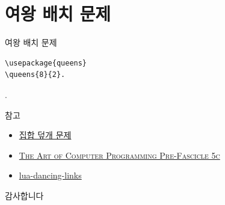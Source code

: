 \documentclass[xcolor=svgnames]{beamer}
\begin{document}
\section{여왕 배치 문제}

%
\begin{frame}[fragile]{여왕 배치 문제}
\begin{verbatim}
\usepackage{queens}
\queens{8}{2}.
\end{verbatim}
\vspace{-10mm}
.
\end{frame}


%
\begin{frame}{참고}
  \begin{itemize}
  \item \href{https://goo.gl/44hiLo}{집합 덮개 문제}
  \item \href{http://www-cs-faculty.stanford.edu/~knuth/fasc5c.ps.gz}
    {\textsc{The Art of Computer Programming Pre-Fascicle 5c}}
  \item \href{https://github.com/sjnam/lua-dancing-links}
    {lua-dancing-links}
  \end{itemize}
\end{frame}

%
\begin{frame}[standout]
  감사합니다
\end{frame}
\end{document}

